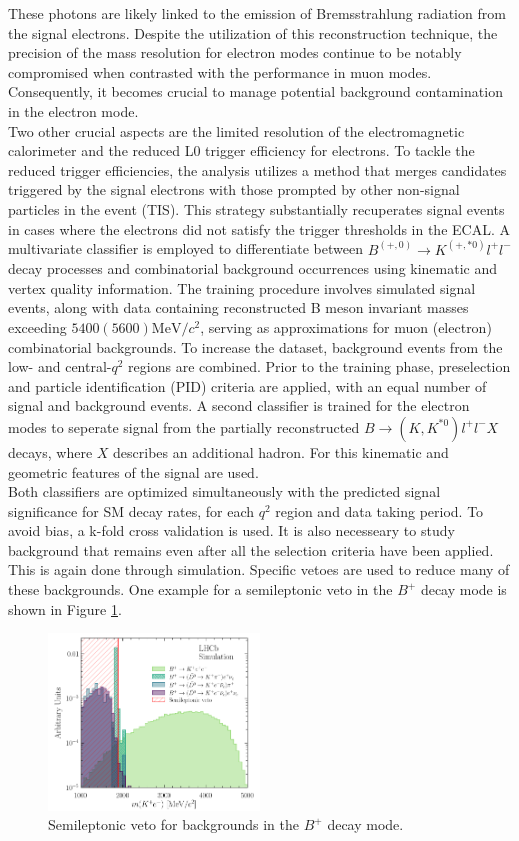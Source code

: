 \documentclass[%
 reprint,
 amsmath,amssymb,
 aps,
]{revtex4-2}
\begin{document}
 These photons are likely linked to the emission of Bremsstrahlung radiation from the signal electrons. 
 Despite the utilization of this reconstruction technique, the precision of the mass resolution for electron modes continue to be notably compromised 
 when contrasted with the performance in muon modes. Consequently, it becomes crucial to manage potential background contamination in the electron mode.
\\
Two other crucial aspects are the limited resolution of the electromagnetic calorimeter and the reduced L0 trigger efficiency for electrons. 
To tackle the reduced trigger efficiencies, the analysis utilizes a method that merges candidates triggered by the signal electrons with those prompted by other non-signal particles in the event (TIS). 
This strategy substantially recuperates signal events in cases where the electrons did not satisfy the trigger thresholds in the ECAL.
A multivariate classifier is employed to differentiate between $B^{(+, 0)} \rightarrow K^{(+, * 0)}l^+ l^-$ decay processes and combinatorial background occurrences using 
kinematic and vertex quality information.
The training procedure involves simulated signal events, along with data containing reconstructed B meson invariant masses exceeding $5400 (5600) {\si{\mega\electronvolt}}/c^2$, 
serving as approximations for muon (electron) combinatorial backgrounds. 
To increase the dataset, background events from the low- and central-$q^2$ regions are combined.
Prior to the training phase, preselection and particle identification (PID) criteria are applied, with an equal number of signal and background events.
A second classifier is trained for the electron modes to seperate signal from the partially reconstructed $B \rightarrow (K, K^{*0})l^+ l^{-}X$ decays, 
where $X$ describes an additional hadron. For this kinematic and geometric features of the signal are used. 
\\
Both classifiers are optimized simultaneously with the predicted signal significance for SM decay rates, for each $q^2$ region and data taking period.
To avoid bias, a k-fold cross validation is used.
It is also necesseary to study background that remains even after all the selection criteria have been applied. This is again done through simulation.
Specific vetoes are used to reduce many of these backgrounds. One example for a semileptonic veto in the $B^+$ decay mode is shown in Figure \ref{fig:2}.
\begin{figure}
    \centering
    \includegraphics[width=0.5\textwidth]{veto2.png}
    \caption{Semileptonic veto for backgrounds in the $B^+$ decay mode.}
    \label{fig:2}
\end{figure}
\end{document}

